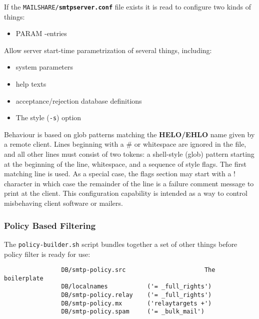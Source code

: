 If the {\tt MAILSHARE/{\bf smtpserver.conf}} file exists it is read 
to configure two kinds of things:

\begin{itemize}
\item  PARAM -entries
\end{itemize}


Allow server start-time parametrization of several things, including:

\begin{itemize}
\item  system parameters
\item  help texts
\item  acceptance/rejection database definitions
\item The style ({\tt -s}) option
\end{itemize}


Behaviour is based on glob patterns matching the 
{\bf HELO/EHLO} name given by a remote client. Lines 
beginning with a \# or whitespace are ignored in the file, and 
all other lines must consist of two tokens: a shell-style (glob) 
pattern starting at the beginning of the line, whitespace, and a 
sequence of style flags. The first matching line is used. As a 
special case, the flags section may start with a ! character in 
which case the remainder of the line is a failure comment message 
to print at the client. This configuration capability is intended 
as a way to control misbehaving client software or mailers.






\subsubsection{Policy Based Filtering}



The {\tt policy-builder.sh} script bundles together a set of other
things before policy filter is ready for use:

\begin{tscreen}
\begin{verbatim}
                DB/smtp-policy.src                      The boilerplate
                DB/localnames           ('= _full_rights')
                DB/smtp-policy.relay    ('= _full_rights')
                DB/smtp-policy.mx       ('relaytargets +')
                DB/smtp-policy.spam     ('= _bulk_mail')
\end{verbatim}
\end{tscreen}


